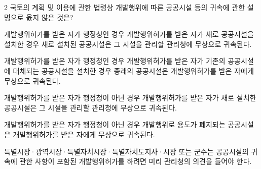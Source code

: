 \begin{question}{2}
국토의 계획 및 이용에 관한 법령상 개발행위에 따른 공공시설 등의 귀속에 관한 설명으로 옳지 않은 것은?
\begin{choices}
  \item 개발행위허가를 받은 자가 행정청인 경우 개발행위허가를 받은 자가 새로 공공시설을 설치한 경우 새로 설치된 공공시설은 그 시설을 관리할 관리청에 무상으로 귀속된다.
  \item 개발행위허가를 받은 자가 행정청인 경우 개발행위허가를 받은 자가 기존의 공공시설에 대체되는 공공시설을 설치한 경우 종래의 공공시설은 개발행위허가를 받은 자에게 무상으로 귀속된다.
  \item 개발행위허가를 받은 자가 행정청이 아닌 경우 개발행위허가를 받은 자가 새로 설치한 공공시설은 그 시설을 관리할 관리청에 무상으로 귀속된다.
  \item 개발행위허가를 받은 자가 행정청이 아닌 경우 개발행위로 용도가 폐지되는 공공시설은 개발행위허가를 받은 자에게 무상으로 귀속된다.
  \item 특별시장·광역시장·특별자치시장·특별자치도지사·시장 또는 군수는 공공시설의 귀속에 관한 사항이 포함된 개발행위허가를 하려면 미리 관리청의 의견을 들어야 한다.
\end{choices}
\end{question}
